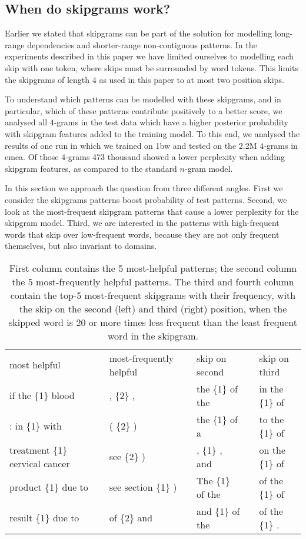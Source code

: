 \subsection{When do skipgrams work?}
Earlier we stated that skipgrams can be part of the solution for modelling long-range dependencies and shorter-range non-contiguous patterns. In the experiments described in this paper we have limited ourselves to modelling each skip with one token, where skips must be surrounded by word tokens. This limits the skipgrams of length $4$ as used in this paper to at most two position skips.

To understand which patterns can be modelled with these skipgrams, and in particular, which of these patterns contribute positively to a better score, we analysed all $4$-grams in the test data which have a higher posterior probability with skipgram features added to the training model. 
%
To this end, we analysed the results of one run in which we trained on 1bw and tested on the 2.2M $4$-grams in emea. Of those $4$-grams 473 thousand showed a lower perplexity when adding skipgram features, as compared to the standard $n$-gram model. 

In this section we approach the question from three different angles. First we consider the skipgrams patterns boost probability of test patterns. Second, we look at the most-frequent skipgram patterns that cause a lower perplexity for the skipgram model. Third, we are interested in the patterns with high-frequent words that skip over low-frequent words, because they are not only frequent themselves, but also invariant to domains. 


\begin{table*}
	\small
	\begin{tabular}{lllllll}
		most helpful  & & most-frequently helpful & & skip on second & & skip on third \\ \cline{1-1}\cline{3-3}\cline{5-5}\cline{7-7}
		if the \{1\} blood & & , \{2\} , & & the \{1\} of the &  & in the \{1\} of\\
		: in \{1\} with & & ( \{2\} ) & & the \{1\} of a   & & to the \{1\} of\\
		treatment \{1\} cervical cancer   & & see \{2\} ) & & , \{1\} , and    & & on the \{1\} of\\
		product \{1\} due to & & see section \{1\} ) & & The \{1\} of the & & of the \{1\} of\\
		result \{1\} due to & & of \{2\} and & & and \{1\} of the & & of the \{1\} . \\
	\end{tabular}
	\caption{First column contains the 5 most-helpful patterns; the second column the 5 most-frequently helpful patterns. The third and fourth column contain the top-5 most-frequent skipgrams with their frequency, with the skip on the second (left) and third (right) position, when the skipped word is 20 or more times less frequent than the least frequent word in the skipgram.}\label{ta:examples}
\end{table*}


